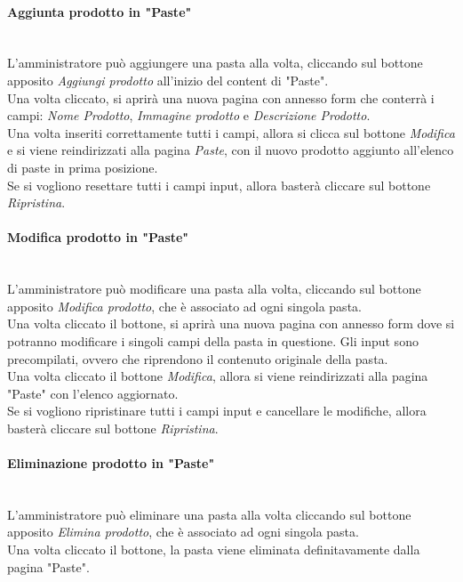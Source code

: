 \paragraph{Aggiunta prodotto in "Paste"}\mbox{}\\
\label{par:AddP}
L'amministratore può aggiungere una pasta alla volta, cliccando sul bottone apposito \emph{Aggiungi prodotto} all'inizio del content di "Paste".\\ 
Una volta cliccato, si aprirà una nuova pagina con annesso form che conterrà i campi: \emph{Nome Prodotto}, \emph{Immagine prodotto} e \emph{Descrizione Prodotto}.\\ 
Una volta inseriti correttamente tutti i campi, allora si clicca sul bottone \emph{Modifica} e si viene reindirizzati alla pagina \emph{Paste}, con il nuovo prodotto 
aggiunto all'elenco di paste in prima posizione.\\
Se si vogliono resettare tutti i campi input, allora basterà cliccare sul bottone \emph{Ripristina}.

\paragraph{Modifica prodotto in "Paste"}\mbox{}\\
\label{par:ModP}
L'amministratore può modificare una pasta alla volta, cliccando sul bottone apposito \emph{Modifica prodotto}, che è associato ad ogni singola pasta.\\ 
Una volta cliccato il bottone, si aprirà una nuova pagina con annesso form dove si potranno modificare i singoli campi della pasta in questione. 
Gli input sono precompilati, ovvero che riprendono il contenuto originale della pasta.\\
Una volta cliccato il bottone \emph{Modifica}, allora si viene reindirizzati alla pagina "Paste" con l'elenco aggiornato.\\
Se si vogliono ripristinare tutti i campi input e cancellare le modifiche, allora basterà cliccare sul bottone \emph{Ripristina}.

\paragraph{Eliminazione prodotto in "Paste"}\mbox{}\\
\label{par:DelP}
L'amministratore può eliminare una pasta alla volta cliccando sul bottone apposito \emph{Elimina prodotto}, che è associato ad ogni singola pasta.\\ 
Una volta cliccato il bottone, la pasta viene eliminata definitavamente dalla pagina "Paste".\\

